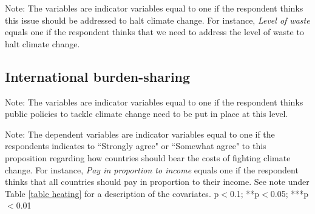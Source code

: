 \documentclass{article}
\begin{document}
\begin{landscape}
	\begin{table}[h!]
		\caption{Issues to address to halt CC}
		\begin{center}
			\scalebox{0.6}{}
		\end{center}
	{\footnotesize Note: The variables are indicator variables equal to one if the respondent thinks this issue should be addressed to halt climate change. For instance, \textit{Level of waste} equals one if the respondent thinks that we need to address the level of waste to halt climate change.}	
	\end{table}		
\end{landscape}

\clearpage
\subsection{International burden-sharing}

\begin{table}[h!]
	\caption{Best level to implement policies to tackle climate change}
	\begin{center}
		\scalebox{0.7}{}
	\end{center}
	{\footnotesize Note: The variables are indicator variables equal to one if the respondent thinks public policies to tackle climate change need to be put in place at this level.}
\end{table}	

\begin{landscape}
	\begin{table}[h!]
	\caption{Countries that should bear the costs}
	\begin{center}
		\scalebox{0.6}{}
	\end{center}
	{\footnotesize Note: The dependent variables are indicator variables equal to one if the respondents indicates to ``Strongly agree" or ``Somewhat agree" to this proposition regarding how countries should bear the costs of fighting climate change. For instance, \textit{Pay in proportion to income} equals one if the respondent thinks that all countries should pay in proportion to their income. See note under Table \ref{table heating} for a description of the covariates.
	\newline *p$<$0.1; **p$<$0.05; ***p$<$0.01}
\end{table}	
\end{landscape}
\end{document}
